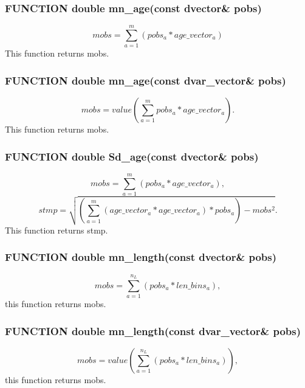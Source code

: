 \documentclass{article}
\begin{document}
\subsubsection{FUNCTION double mn\_age(const dvector\& pobs)}
\begin{equation}
    mobs = \sum_{a=1}^m(pobs_a*age\_vector_a)
\end{equation}
This function returns mobs.\\

\subsubsection{FUNCTION double mn\_age(const dvar\_vector\& pobs)}

\begin{equation}
    mobs = value\left(\sum_{a=1}^m pobs_a*age\_vector_a\right).
\end{equation}
This function returns mobs.\\

\subsubsection{FUNCTION double Sd\_age(const dvector\& pobs)}
\begin{equation}
    mobs = \sum_{a=1}^m(pobs_a*age\_vector_a),
\end{equation}
\begin{equation}
    stmp = \sqrt{\left(\sum_{a=1}^m(age\_vector_a*age\_vector_a)*pobs_a\right) - mobs^2}.
\end{equation}
This function returns stmp.\\
\subsubsection{FUNCTION double mn\_length(const dvector\& pobs)}
\begin{equation}
    mobs = \sum_{a=1}^{n_L}(pobs_a*len\_bins_a),
\end{equation}
this function returns mobs.\\
\subsubsection{FUNCTION double mn\_length(const dvar\_vector\& pobs)}
\begin{equation}
    mobs = value\left(\sum_{a=1}^{n_L}(pobs_a*len\_bins_a)\right),
\end{equation}
this function returns mobs.\\
\end{document}
